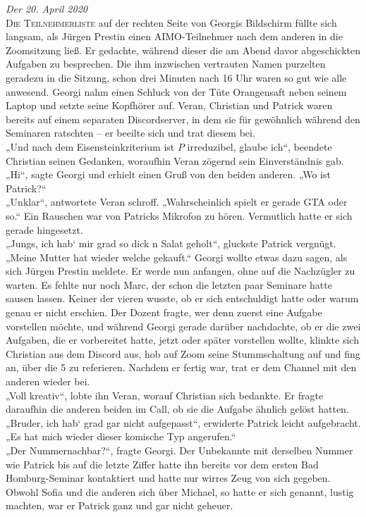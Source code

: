 \documentclass[oneside]{memoir}
\begin{document}
\textit{Der 20. April 2020} \\ 
\lettrine{D}{ie Teilnehmerliste} auf der rechten Seite von Georgis Bildschirm füllte sich langsam, als Jürgen Prestin einen AIMO-Teilnehmer nach dem anderen in die Zoomsitzung ließ. Er gedachte, während dieser die am Abend davor abgeschickten Aufgaben zu besprechen. Die ihm inzwischen vertrauten Namen purzelten geradezu in die Sitzung, schon drei Minuten nach 16 Uhr waren so gut wie alle anwesend. Georgi nahm einen Schluck von der Tüte Orangensaft neben seinem Laptop und setzte seine Kopfhörer auf. Veran, Christian und Patrick waren bereits auf einem separaten Discordserver, in dem sie für gewöhnlich während den Seminaren ratschten – er beeilte sich und trat diesem bei. \\
„Und nach dem Eisensteinkriterium ist $P$ irreduzibel, glaube ich“, beendete Christian seinen Gedanken, woraufhin Veran zögernd sein Einverständnis gab. \\
„Hi“, sagte Georgi und erhielt einen Gruß von den beiden anderen. „Wo ist Patrick?“ \\
„Unklar“, antwortete Veran schroff. „Wahrscheinlich spielt er gerade GTA oder so.“
Ein Rauschen war von Patricks Mikrofon zu hören. Vermutlich hatte er sich gerade hingesetzt. \\ 
„Jungs, ich hab‘ mir grad so dick n Salat geholt“, gluckste Patrick vergnügt. „Meine Mutter hat wieder welche gekauft.“
Georgi wollte etwas dazu sagen, als sich Jürgen Prestin meldete. Er werde nun anfangen, ohne auf die Nachzügler zu warten. Es fehlte nur noch Marc, der schon die letzten paar Seminare hatte sausen lassen. Keiner der vieren wusste, ob er sich entschuldigt hatte oder warum genau er nicht erschien. Der Dozent fragte, wer denn zuerst eine Aufgabe vorstellen möchte, und während Georgi gerade darüber nachdachte, ob er die zwei Aufgaben, die er vorbereitet hatte, jetzt oder später vorstellen wollte, klinkte sich Christian aus dem Discord aus, hob auf Zoom seine Stummschaltung auf und fing an, über die 5 zu referieren. 
Nachdem er fertig war, trat er dem Channel mit den anderen wieder bei.  \\
„Voll kreativ“, lobte ihn Veran, worauf Christian sich bedankte. Er fragte daraufhin die anderen beiden im Call, ob sie die Aufgabe ähnlich gelöst hatten. \\
„Bruder, ich hab‘ grad gar nicht aufgepasst“, erwiderte Patrick leicht aufgebracht. „Es hat mich wieder dieser komische Typ angerufen.“ \\
„Der Nummernachbar?“, fragte Georgi. Der Unbekannte mit derselben Nummer wie Patrick bis auf die letzte Ziffer hatte ihn bereits vor dem ersten Bad Homburg-Seminar kontaktiert und hatte nur wirres Zeug von sich gegeben. Obwohl Sofia und die anderen sich über Michael, so hatte er sich genannt, lustig machten, war er Patrick ganz und gar nicht geheuer. \\
\end{document}
